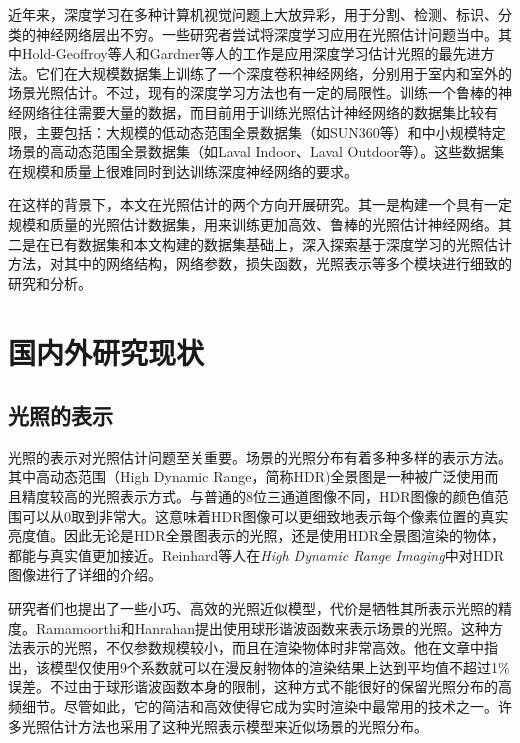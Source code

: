近年来，深度学习在多种计算机视觉问题上大放异彩，用于分割、检测、标识、分类的神经网络层出不穷。一些研究者尝试将深度学习应用在光照估计问题当中。其中Hold-Geoffroy等人\cite{hold2017deep}和Gardner等人\cite{gardner2017learning}的工作是应用深度学习估计光照的最先进方法。它们在大规模数据集上训练了一个深度卷积神经网络，分别用于室内和室外的场景光照估计。不过，现有的深度学习方法也有一定的局限性。训练一个鲁棒的神经网络往往需要大量的数据，而目前用于训练光照估计神经网络的数据集比较有限，主要包括：大规模的低动态范围全景数据集（如SUN360\cite{xiao2012recognizing}等）和中小规模特定场景的高动态范围全景数据集（如Laval Indoor\cite{gardner2017learning}、Laval Outdoor\cite{hold2019deep}等）。这些数据集在规模和质量上很难同时到达训练深度神经网络的要求。

在这样的背景下，本文在光照估计的两个方向开展研究。其一是构建一个具有一定规模和质量的光照估计数据集，用来训练更加高效、鲁棒的光照估计神经网络。其二是在已有数据集和本文构建的数据集基础上，深入探索基于深度学习的光照估计方法，对其中的网络结构，网络参数，损失函数，光照表示等多个模块进行细致的研究和分析。

\section{国内外研究现状}
\subsection{光照的表示}
光照的表示对光照估计问题至关重要。场景的光照分布有着多种多样的表示方法。其中高动态范围（High Dynamic Range，简称HDR)全景图是一种被广泛使用而且精度较高的光照表示方式。与普通的8位三通道图像不同，HDR图像的颜色值范围可以从0取到非常大。这意味着HDR图像可以更细致地表示每个像素位置的真实亮度值。因此无论是HDR全景图表示的光照，还是使用HDR全景图渲染的物体，都能与真实值更加接近。Reinhard等人在\textit{High Dynamic Range Imaging}\cite{reinhard2005high}中对HDR图像进行了详细的介绍。

研究者们也提出了一些小巧、高效的光照近似模型，代价是牺牲其所表示光照的精度。Ramamoorthi和Hanrahan\cite{ramamoorthi2001efficient}提出使用球形谐波函数来表示场景的光照。这种方法表示的光照，不仅参数规模较小，而且在渲染物体时非常高效。他在文章中指出，该模型仅使用9个系数就可以在漫反射物体的渲染结果上达到平均值不超过1\%误差。不过由于球形谐波函数本身的限制，这种方式不能很好的保留光照分布的高频细节。尽管如此，它的简洁和高效使得它成为实时渲染中最常用的技术之一\cite{green2003spherical,sloan2008stupid}。许多光照估计方法也采用了这种光照表示模型来近似场景的光照分布。

